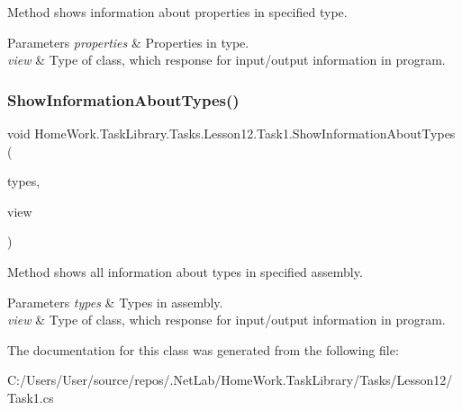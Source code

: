Method shows information about properties in specified type. 


\begin{DoxyParams}{Parameters}
{\em properties} & Properties in type.\\
\hline
{\em view} & Type of class, which response for input/output information in program.\\
\hline
\end{DoxyParams}
\mbox{\label{class_home_work_1_1_task_library_1_1_tasks_1_1_lesson12_1_1_task1_a26fbb78c701a3b7194b5be19d0be27c6}} 
\subsubsection{\texorpdfstring{ShowInformationAboutTypes()}{ShowInformationAboutTypes()}}
{\footnotesize\ttfamily void Home\+Work.\+Task\+Library.\+Tasks.\+Lesson12.\+Task1.\+Show\+Information\+About\+Types (\begin{DoxyParamCaption}\item[{Type \mbox{[}$\,$\mbox{]}}]{types,  }\item[{I\+Information}]{view }\end{DoxyParamCaption})\hspace{0.3cm}{\ttfamily [private]}}



Method shows all information about types in specified assembly. 


\begin{DoxyParams}{Parameters}
{\em types} & Types in assembly.\\
\hline
{\em view} & Type of class, which response for input/output information in program.\\
\hline
\end{DoxyParams}


The documentation for this class was generated from the following file\+:\begin{DoxyCompactItemize}
\item 
C\+:/\+Users/\+User/source/repos/.\+Net\+Lab/\+Home\+Work.\+Task\+Library/\+Tasks/\+Lesson12/Task1.\+cs\end{DoxyCompactItemize}
